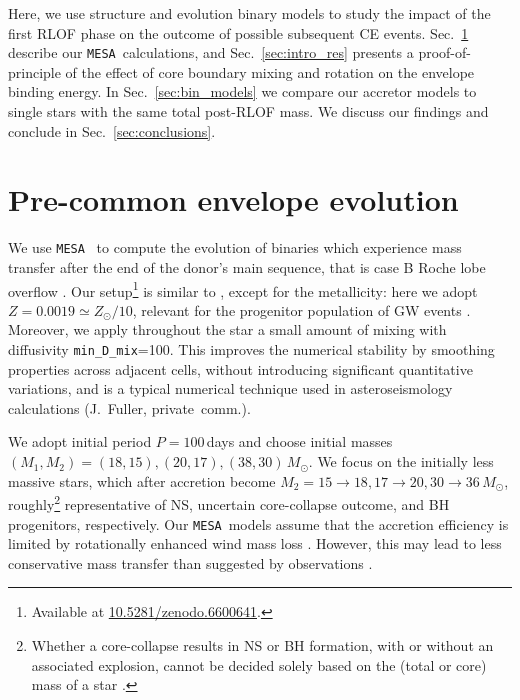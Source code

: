 \documentclass[twocolumn,twocolappendix,trackchanges]{aastex63}
\newcommand{\code}[1]{\texttt{#1}}
\newcommand{\mesa}{\code{MESA}}
\DeclareRobustCommand{\Secref}[1]{Sec.~\ref{#1}}
\begin{document}
Here, we use structure and evolution binary models to study the impact
of the first RLOF phase on the outcome of possible subsequent CE
events. \Secref{sec:methods} describe our \mesa\ calculations, and
\Secref{sec:intro_res} presents a proof-of-principle of the effect of
core boundary mixing and rotation on the envelope binding energy. In
\Secref{sec:bin_models} we compare our accretor models to single stars
with the same total post-RLOF mass. We discuss our findings and
conclude in \Secref{sec:conclusions}.

\section{Pre-common envelope evolution}
\label{sec:methods}

We use \mesa\
\citep[version 15140,][]{paxton:2011, paxton:2013, paxton:2015,
  paxton:2018, paxton:2011} to compute the evolution of binaries which
experience mass transfer after the end of the donor's main sequence,
that is case B Roche lobe overflow \citep[RLOF,][]{kippenhahn:1967}.
Our setup\footnote{Available at \url{10.5281/zenodo.6600641}.} is similar to
\cite{renzo:2021zoph}, except for the
metallicity: here we adopt $Z=0.0019\simeq Z_\odot/10$, relevant for
the progenitor population of GW events \citep[e.g.,][]{vanson:2021}. Moreover, we apply
throughout the star a small amount of mixing with diffusivity
\texttt{min\_D\_mix}=100. This improves the numerical stability by
smoothing properties across adjacent cells, without introducing
significant quantitative variations, and is a typical numerical technique
used in asteroseismology calculations (J.~Fuller, private~comm.).

We adopt initial period $P=100$\,days and choose initial masses
$(M_{1}, M_{2}) = (18, 15), (20, 17), (38, 30)\,M_\odot$. We focus on
the initially less massive stars, which after accretion become
$M_2=15\rightarrow 18, 17\rightarrow 20, 30\rightarrow 36\,M_\odot$, roughly\footnote{Whether a
  core-collapse results in NS or BH formation, with or without an
  associated explosion, cannot be decided solely based on the (total
  or core) mass of a star \citep[e.g.,][]{oconnor:11, farmer:16,
    patton:20, zapartas:21b, patton:22}. } representative of NS,
uncertain core-collapse outcome, and BH progenitors, respectively. Our \mesa\ models
assume that the accretion efficiency is limited by rotationally
enhanced wind mass loss \citep[e.g.,][]{sravan:2019, wang:2020,
  renzo:2021zoph, sen:2022}. However, this may lead to less
conservative mass transfer than suggested by observations
\citep[e.g.,][]{wang:2021a}.
\end{document}
